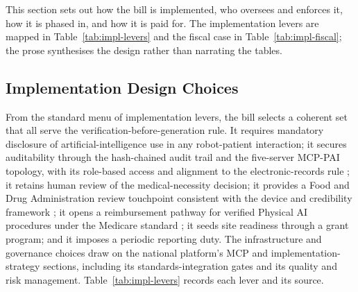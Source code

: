 
This section sets out how the bill is implemented, who oversees and enforces it,
how it is phased in, and how it is paid for. The implementation levers are
mapped in Table~\ref{tab:impl-levers} and the fiscal case in
Table~\ref{tab:impl-fiscal}; the prose synthesises the design rather than
narrating the tables.

\subsection{Implementation Design Choices}

From the standard menu of implementation levers, the bill selects a coherent set
that all serve the verification-before-generation rule. It requires mandatory
disclosure of artificial-intelligence use in any robot-patient interaction; it
secures auditability through the hash-chained audit trail and the five-server
MCP-PAI topology, with its role-based access and alignment to the
electronic-records rule \cite{kawchak2026mcp, cfr-part11}; it retains human review
of the medical-necessity decision; it provides a Food and Drug Administration
review touchpoint consistent with the device and credibility framework
\cite{fda2023credibility}; it opens a reimbursement pathway for verified Physical
AI procedures under the Medicare standard \cite{usc-1395y}; it seeds site
readiness through a grant program; and it imposes a periodic reporting duty. The
infrastructure and governance choices draw on the national platform's MCP and
implementation-strategy sections, including its standards-integration gates and
its quality and risk management. Table~\ref{tab:impl-levers} records each lever
and its source.

